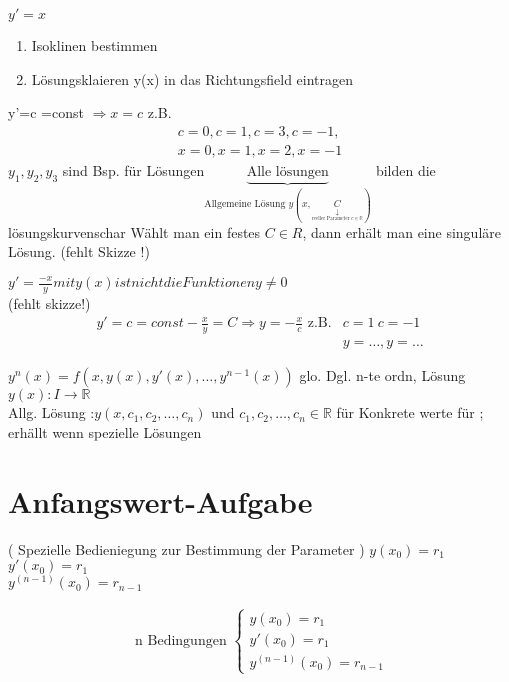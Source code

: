 \begin{example}
	$y'= x $ \begin{enumerate}
		\item Isoklinen bestimmen 
		\item  Lösungsklaieren y(x) in das Richtungsfield eintragen
	\end{enumerate}
y'=c =const $\Rightarrow x=c$ z.B.\begin{align*}
c=0 , c=1 , c=3 ,c=-1,\\
 x=0, x=1 ,x=2, x =-1
\end{align*} 
$y_1,y_2, y_3$ sind Bsp. für Lösungen$\underbrace{ \text{Alle lösungen}}_{\text{Allgemeine Lösung } y(x,\underset{\underset{\scriptstyle\text{reeller Parameter } c \in \mathbb{R} }{\scriptstyle\downarrow}}{C} )}$ bilden die lösungskurvenschar 
Wählt man ein festes $C \in R$, dann erhält man eine singuläre Lösung.
(fehlt Skizze !)
\end{example}
\begin{example}
	$y'=\frac{-x}{y} mit y(x)ist nicht die Funktionen y \neq 0$\\
	(fehlt skizze!)
	\begin{align*}
	y'= c=const  -\frac{x}{y}=C \Rightarrow y= -\frac{x}{c}\text{ z.B.} &c=1 \ c=-1 \\ 
																   &y=\dots , y=\dots
	\end{align*}

	
\end{example}
\begin{definition}
$y^{n}(x)=f(x,y(x),y'(x),\dots, y^{n-1}(x) )$ glo. Dgl. n-te ordn, Lösung $ y(x):I\rightarrow \mathbb{R}$\\
Allg. Lösung :$ y(x,c_1,c_2,\dots,c_n) $ und $ c_1,c_2,\dots ,c_n \in \mathbb{R}$
für Konkrete werte für ; erhällt wenn spezielle Lösungen
\end{definition}
\section{Anfangswert-Aufgabe}
( Spezielle Bedieniegung  zur Bestimmung der Parameter )
$y(x_0)=r_1$\\
$y'(x_0)= r_1$\\
$y^{(n-1)}(x_0)=r_{n-1}$

\begin{align*}
\text{ n Bedingungen }
\begin{cases}
y(x_0)=r_1\\
y'(x_0)= r_1\\
y^{(n-1)}(x_0)=r_{n-1}
\end{cases}
\end{align*}

